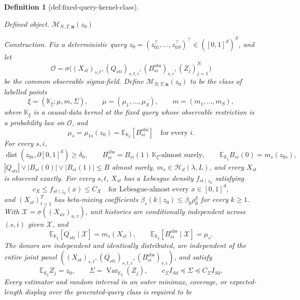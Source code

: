 \documentclass{article}
\newtheorem{definition}{Definition}
\begin{document}
\begin{definition}[def:fixed-query-kernel-class]\label{def:fixed-query-kernel-class}
\par\smallskip\noindent\emph{Defined object.} \(\mathcal M_{N,T,\mathbf n}(z_0)\)
\par\smallskip\noindent\emph{Construction.} Fix a deterministic query
\(z_0=(z_{01}^{\top},\ldots,z_{0S}^{\top})^{\top}\in([0,1]^d)^S\), and let
\[
 \mathcal O=\sigma\bigl((X_{st})_{s,t},(Q_{sti})_{s,t,i},
 (B_{si}^{\mathrm{obs}})_{s,i},(Z_j)_{j=1}^{N}\bigr)
\]
be the common observable sigma-field.  Define
\(\mathcal M_{N,T,\mathbf n}(z_0)\) to be the class of labelled points
\[
 \xi=(\mathbb K_\xi;\mu,m,\Sigma),
 \qquad \mu=(\mu_1,\ldots,\mu_S),
 \qquad m=(m_1,\ldots,m_S),                                    \tag{1}
\]
where \(\mathbb K_\xi\) is a causal-data kernel at the fixed query whose
observable restriction is a probability law on \(\mathcal O\), and
\[
 \mu_s=\mu_{1s}(z_0)
 =\mathbb E_{\mathbb K_\xi}[B_{si}^{\mathrm{obs}}]
 \quad\text{for every }i.                                      \tag{2}
\]
For every \(s,i\),
\[
 \operatorname{dist}(z_{0s},\partial[0,1]^d)\ge\delta_0,
 \qquad B_{si}^{\mathrm{obs}}=B_{si}(1)
     \ \mathbb K_\xi\text{-almost surely},
 \qquad \mathbb E_{\mathbb K_\xi}B_{si}(0)=m_s(z_{0s}),       \tag{3}
\]
\(|Q_{sti}|\vee|B_{si}(0)|\vee|B_{si}(1)|\le B\) almost
surely, \(m_s\in\mathcal H_d(\lambda,L)\), and every \(X_{st}\) is
observed exactly.  For every \(s,t\), \(X_{st}\) has a Lebesgue density
\(f_{st\mid z_0}\) satisfying
\[
 c_X\le f_{st\mid z_0}(x)\le C_X
 \quad\text{for Lebesgue-almost every }x\in[0,1]^d,             \tag{4}
\]
and \((X_{st})_{t=1}^{T}\) has beta-mixing coefficients
\(\beta_s(k\mid z_0)\le\beta_0\rho_0^k\) for every \(k\ge1\).  With
\(\mathcal X=\sigma((X_{uv})_{u,v})\), unit histories are conditionally
independent across \((s,i)\) given \(\mathcal X\), and
\[
 \mathbb E_{\mathbb K_\xi}[Q_{sti}\mid\mathcal X]=m_s(X_{st}),
 \qquad
 \mathbb E_{\mathbb K_\xi}[B_{si}^{\mathrm{obs}}\mid\mathcal X]=\mu_s.
                                                                    \tag{5}
\]
The donors are independent and identically distributed, are independent of
the entire joint panel
\(((X_{st})_{s,t},(Q_{sti})_{s,t,i},(B_{si}^{\mathrm{obs}})_{s,i})\), and
satisfy
\[
 \mathbb E_{\mathbb K_\xi}Z_j=z_0,
 \qquad \Sigma=\operatorname{Var}_{\mathbb K_\xi}(Z_j),
 \qquad c_\Sigma I_{Sd}\preceq\Sigma\preceq C_\Sigma I_{Sd}.  \tag{6}
\]
Every estimator and random interval in an outer minimax, coverage, or
expected-length display over the generated-query class is required to be

\end{definition}
\end{document}
